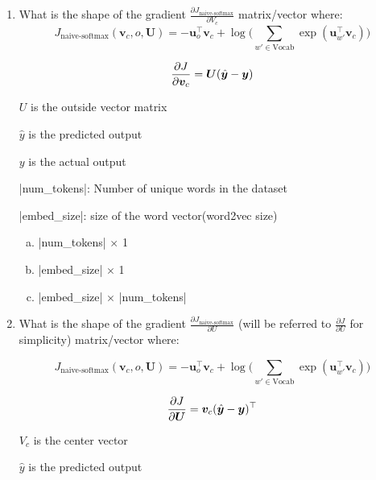 \begin{enumerate}[1.]

\item {}
What is the shape of the gradient $\frac{\partial J_\text{naive-softmax}}{\partial V_c}$ matrix/vector where:
\begin{equation*} J_{\text{naive-softmax}}(\bm v_c, o, \bm U) = - \bm u_{o}^\top \bm v_c + \log \bigg( \sum_{w' \in \text{Vocab}} \exp(\bm u_{w'}^\top \bm v_c) \bigg) \end{equation*}

\begin{equation*} {\partial J \over \partial \bm v_c} = \bm U(\hat{\bm y} - \bm y)\end{equation*}

$U$ is the outside vector matrix

$\hat{y}$ is the predicted output

$y$ is the actual output

|num_tokens|: Number of unique words in the dataset

|embed_size|: size of the word vector(word2vec size)

\begin{enumerate}[(a)]
\item |num_tokens| $\times$ 1
\item |embed_size| $\times$ 1
\item |embed_size| $\times$ |num_tokens|
\end{enumerate}


\item {}
What is the shape of the gradient $\frac{\partial J_\text{naive-softmax}}{\partial U}$ (will be referred to $\frac{\partial J}{\partial U}$ for simplicity) matrix/vector where:

\begin{equation*} J_{\text{naive-softmax}}(\bm v_c, o, \bm U) = - \bm u_{o}^\top \bm v_c + \log \bigg( \sum_{w' \in \text{Vocab}} \exp(\bm u_{w'}^\top \bm v_c) \bigg) \end{equation*}

\begin{equation*} {\partial J \over \partial \bm U } = {\bm v_c} (\hat{\bm y} - \bm y)^\top \end{equation*}

$V_c$ is the center vector

$\hat{y}$ is the predicted output


\end{enumerate}
